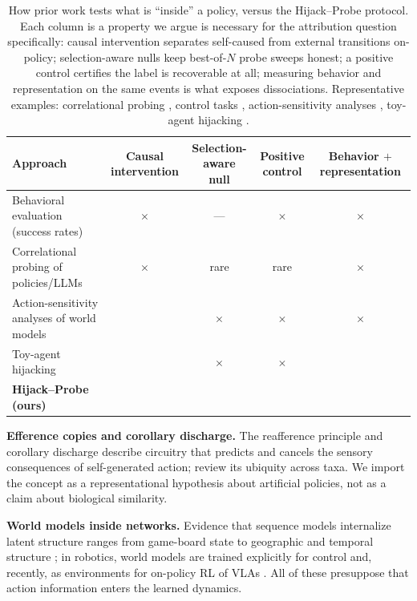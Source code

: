 \documentclass{article}
\newcommand{\cmark}{\checkmark}
\newcommand{\xmark}{$\times$}
\begin{document}
\begin{table}[t]
\caption{How prior work tests what is ``inside'' a policy, versus the
Hijack--Probe protocol. Each column is a property we argue is necessary for
the attribution question specifically: causal intervention separates
self-caused from external transitions on-policy; selection-aware nulls keep
best-of-$N$ probe sweeps honest; a positive control certifies the label is
recoverable at all; measuring behavior and representation on the same events
is what exposes dissociations. Representative examples: correlational probing
\citep{alain2017,li2023othello,gurnee2024language}, control tasks
\citep{hewitt2019}, action-sensitivity analyses \citep{li2026dueling},
toy-agent hijacking \citep{ye2026prediction}.}
\label{tab:taxonomy}
\vskip 0.1in
\centering
\footnotesize
\begin{tabular}{lcccc}
\toprule
Approach & \shortstack{Causal\\intervention} & \shortstack{Selection-aware\\null} & \shortstack{Positive\\control} & \shortstack{Behavior $+$\\representation} \\
\midrule
Behavioral evaluation (success rates) & \xmark & --- & \xmark & \xmark \\
Correlational probing of policies/LLMs & \xmark & rare & rare & \xmark \\
Action-sensitivity analyses of world models & \cmark & \xmark & \xmark & \xmark \\
Toy-agent hijacking & \cmark & \xmark & \xmark & \cmark \\
\textbf{Hijack--Probe (ours)} & \cmark & \cmark & \cmark & \cmark \\
\bottomrule
\end{tabular}
\vskip -0.1in
\end{table}

\textbf{Efference copies and corollary discharge.} The reafference principle
\citep{vonholst1950} and corollary discharge \citep{sperry1950} describe
circuitry that predicts and cancels the sensory consequences of
self-generated action; \citet{crapse2008} review its ubiquity across taxa. We
import the concept as a representational hypothesis about artificial
policies, not as a claim about biological similarity.

\textbf{World models inside networks.} Evidence that sequence models
internalize latent structure ranges from game-board state
\citep{li2023othello} to geographic and temporal structure
\citep{gurnee2024language}; in robotics, world models are trained explicitly
for control \citep{ha2018world,hafner2020dream} and, recently, as
environments for on-policy RL of VLAs \citep{zhu2025wmpo}. All of these
presuppose that action information enters the learned dynamics.
\end{document}
